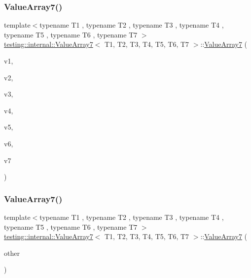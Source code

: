 \subsubsection{\texorpdfstring{ValueArray7()}{ValueArray7()}\hspace{0.1cm}{\footnotesize\ttfamily [1/2]}}
{\footnotesize\ttfamily template$<$typename T1 , typename T2 , typename T3 , typename T4 , typename T5 , typename T6 , typename T7 $>$ \\
\mbox{\hyperlink{classtesting_1_1internal_1_1_value_array7}{testing\+::internal\+::\+Value\+Array7}}$<$ T1, T2, T3, T4, T5, T6, T7 $>$\+::\mbox{\hyperlink{classtesting_1_1internal_1_1_value_array7}{Value\+Array7}} (\begin{DoxyParamCaption}\item[{T1}]{v1,  }\item[{T2}]{v2,  }\item[{T3}]{v3,  }\item[{T4}]{v4,  }\item[{T5}]{v5,  }\item[{T6}]{v6,  }\item[{T7}]{v7 }\end{DoxyParamCaption})\hspace{0.3cm}{\ttfamily [inline]}}

\mbox{\label{classtesting_1_1internal_1_1_value_array7_ab4be0da0f772c885c6fe681ea486ece4}} 
\subsubsection{\texorpdfstring{ValueArray7()}{ValueArray7()}\hspace{0.1cm}{\footnotesize\ttfamily [2/2]}}
{\footnotesize\ttfamily template$<$typename T1 , typename T2 , typename T3 , typename T4 , typename T5 , typename T6 , typename T7 $>$ \\
\mbox{\hyperlink{classtesting_1_1internal_1_1_value_array7}{testing\+::internal\+::\+Value\+Array7}}$<$ T1, T2, T3, T4, T5, T6, T7 $>$\+::\mbox{\hyperlink{classtesting_1_1internal_1_1_value_array7}{Value\+Array7}} (\begin{DoxyParamCaption}\item[{const \mbox{\hyperlink{classtesting_1_1internal_1_1_value_array7}{Value\+Array7}}$<$ T1, T2, T3, T4, T5, T6, T7 $>$ \&}]{other }\end{DoxyParamCaption})\hspace{0.3cm}{\ttfamily [inline]}}




